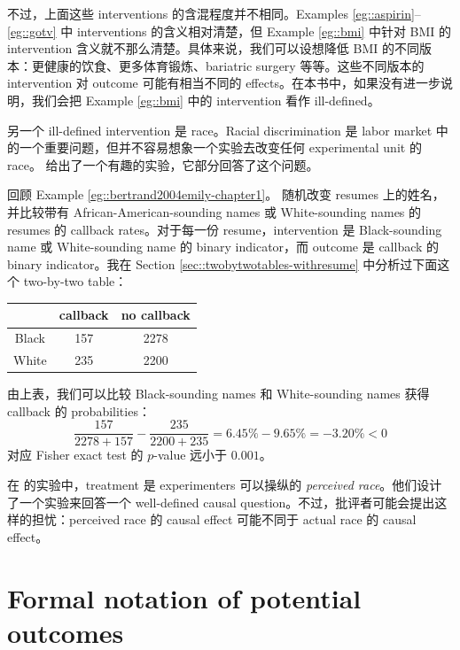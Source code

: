 不过，上面这些 interventions 的含混程度并不相同。Examples \ref{eg::aspirin}--\ref{eg::gotv} 中 interventions 的含义相对清楚，但 Example \ref{eg::bmi} 中针对 BMI 的 intervention 含义就不那么清楚。具体来说，我们可以设想降低 BMI 的不同版本：更健康的饮食、更多体育锻炼、bariatric surgery 等等。这些不同版本的 intervention 对 outcome 可能有相当不同的 effects。在本书中，如果没有进一步说明，我们会把 Example \ref{eg::bmi} 中的 intervention 看作 ill-defined。

 

另一个 ill-defined intervention 是 race。Racial discrimination 是 labor market 中的一个重要问题，但并不容易想象一个实验去改变任何 experimental unit 的 race。\citet{bertrand2004emily} 给出了一个有趣的实验，它部分回答了这个问题。

\begin{example}\label{eg::race}
回顾 Example \ref{eg::bertrand2004emily-chapter1}。
\citet{bertrand2004emily} 随机改变 resumes 上的姓名，并比较带有 African-American-sounding names 或 White-sounding names 的 resumes 的 callback rates。对于每一份 resume，intervention 是 Black-sounding name 或 White-sounding name 的 binary indicator，而 outcome 是 callback 的 binary indicator。我在 Section \ref{sec::twobytwotables-withresume} 中分析过下面这个 two-by-two table：

\begin{center} 
\begin{tabular}{ccc}
\hline 
 &   callback & no  callback \\
 \hline 
Black  & 157 & 2278\\
White   & 235 & 2200\\
\hline 
\end{tabular}
\end{center}

由上表，我们可以比较 Black-sounding names 和 White-sounding names 获得 callback 的 probabilities：
$$
\frac{157}{2278 + 157} - \frac{235}{  2200 + 235 } = 6.45\% - 9.65\% = - 3.20\% < 0
$$
对应 Fisher exact test 的 $p$-value 远小于 $0.001$。
\end{example}

在 \citet{bertrand2004emily} 的实验中，treatment 是 experimenters 可以操纵的 {\it perceived race}。他们设计了一个实验来回答一个 well-defined causal question。不过，批评者可能会提出这样的担忧：perceived race 的 causal effect 可能不同于 actual race 的 causal effect。



\section{Formal notation of potential outcomes}
\label{sec::po-sciencetable}

